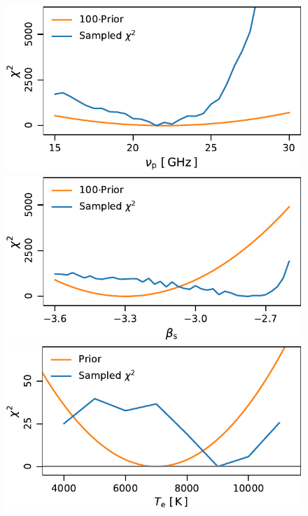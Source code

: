\documentclass[twocolumn]{aa}
\begin{document}
\begin{figure}
  \center	
  \includegraphics[width=\linewidth]{figs/chisq_spectest_ame_NU_P.pdf}\\
  \includegraphics[width=\linewidth]{figs/chisq_spectest_synch_BETA.pdf}\\
  \includegraphics[width=\linewidth]{figs/chisq_spectest2_ff_Te.pdf}\\

\end{figure}
\end{document}
